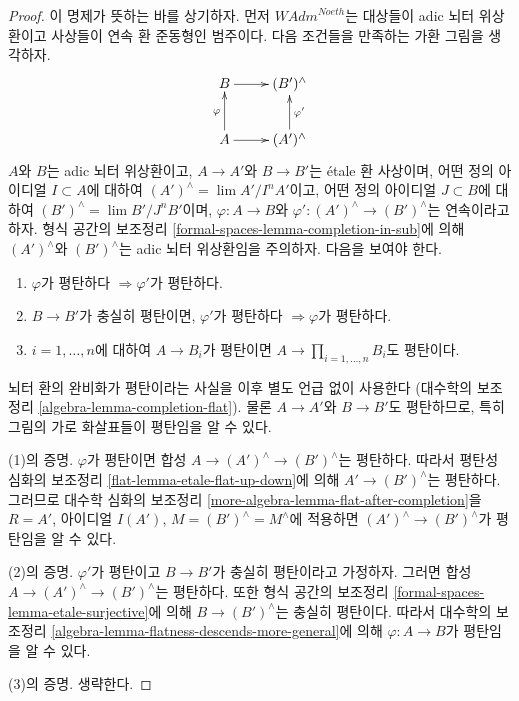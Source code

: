 \begin{proof}
이 명제가 뜻하는 바를 상기하자. 먼저 $\textit{WAdm}^{Noeth}$는
대상들이 adic 뇌터 위상환이고 사상들이 연속 환 준동형인 범주이다.
다음 조건들을 만족하는 가환 그림을 생각하자.
$$
\xymatrix{
B \ar[r] & (B')^\wedge \\
A \ar[r] \ar[u]^\varphi & (A')^\wedge \ar[u]_{\varphi'}
}
$$
$A$와 $B$는 adic 뇌터 위상환이고,
$A \to A'$와 $B \to B'$는 \'etale 환 사상이며,
어떤 정의 아이디얼 $I \subset A$에 대하여
$(A')^\wedge = \lim A'/I^nA'$이고,
어떤 정의 아이디얼 $J \subset B$에 대하여
$(B')^\wedge = \lim B'/J^nB'$이며,
$\varphi : A \to B$와 $\varphi' : (A')^\wedge \to (B')^\wedge$는 연속이라고 하자.
형식 공간의 보조정리 \ref{formal-spaces-lemma-completion-in-sub}에 의해
$(A')^\wedge$와 $(B')^\wedge$는 adic 뇌터 위상환임을 주의하자.
다음을 보여야 한다.
\begin{enumerate}
\item $\varphi$가 평탄하다 $\Rightarrow \varphi'$가 평탄하다.
\item $B \to B'$가 충실히 평탄이면, $\varphi'$가 평탄하다
$\Rightarrow \varphi$가 평탄하다.
\item $i = 1, \ldots, n$에 대하여 $A \to B_i$가 평탄이면
$A \to \prod_{i = 1, \ldots, n} B_i$도 평탄이다.
\end{enumerate}
뇌터 환의 완비화가 평탄이라는 사실을 이후 별도 언급 없이 사용한다
(대수학의 보조정리 \ref{algebra-lemma-completion-flat}).
물론 $A \to A'$와 $B \to B'$도 평탄하므로, 특히 그림의 가로 화살표들이
평탄임을 알 수 있다.

\medskip\noindent
(1)의 증명. $\varphi$가 평탄이면 합성
$A \to (A')^\wedge \to (B')^\wedge$는 평탄하다.
따라서 평탄성 심화의 보조정리 \ref{flat-lemma-etale-flat-up-down}에 의해
$A' \to (B')^\wedge$는 평탄하다.
그러므로 대수학 심화의 보조정리
\ref{more-algebra-lemma-flat-after-completion}을
$R = A'$, 아이디얼 $I(A')$, $M = (B')^\wedge = M^\wedge$에 적용하면
$(A')^\wedge \to (B')^\wedge$가 평탄임을 알 수 있다.

\medskip\noindent
(2)의 증명. $\varphi'$가 평탄이고 $B \to B'$가 충실히 평탄이라고 가정하자.
그러면 합성 $A \to (A')^\wedge \to (B')^\wedge$는 평탄하다.
또한 형식 공간의 보조정리
\ref{formal-spaces-lemma-etale-surjective}에 의해
$B \to (B')^\wedge$는 충실히 평탄이다.
따라서 대수학의 보조정리 \ref{algebra-lemma-flatness-descends-more-general}에 의해
$\varphi : A \to B$가 평탄임을 알 수 있다.

\medskip\noindent
(3)의 증명. 생략한다.
\end{proof}

